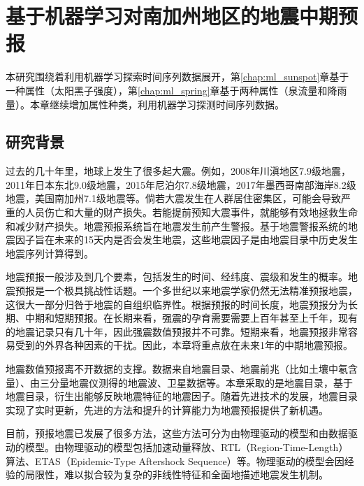 \chapter{基于机器学习对南加州地区的地震中期预报}\label{chap:ml_seismic}

本研究围绕着利用机器学习探索时间序列数据展开，第\ref{chap:ml_sunspot}章基于一种属性（太阳黑子强度），第\ref{chap:ml_spring}章基于两种属性（泉流量和降雨量）。本章继续增加属性种类，利用机器学习探测时间序列数据。

\section{研究背景}\label{sec:seism_introduction}

过去的几十年里，地球上发生了很多起大震。例如，2008年川滇地区7.9级地震，2011年日本东北9.0级地震，2015年尼泊尔7.8级地震，2017年墨西哥南部海岸8.2级地震，美国南加州7.1级地震等。倘若大震发生在人群居住密集区，可能会导致严重的人员伤亡和大量的财产损失。若能提前预知大震事件，就能够有效地拯救生命和减少财产损失。地震预报系统旨在地震发生前产生警报\citep{allen1976responsibilities}。基于地震警报系统的地震因子旨在未来的15天内是否会发生地震，这些地震因子是由地震目录中历史发生地震序列计算得到。

地震预报一般涉及到几个要素，包括发生的时间、经纬度、震级和发生的概率\citep{allen1976responsibilities}。地震预报是一个极具挑战性话题\citep{geller1997earthquakes}。一个多世纪以来地震学家仍然无法精准预报地震，这很大一部分归咎于地震的自组织临界性。根据预报的时间长度，地震预报分为长期、中期和短期预报\citep{Pulinets2018What}。在长期来看，强震的孕育需要需要上百年甚至上千年，现有的地震记录只有几十年，因此强震数值预报并不可靠。短期来看，地震预报非常容易受到的外界各种因素的干扰。因此，本章将重点放在未来1年的中期地震预报。

地震数值预报离不开数据的支撑。数据来自地震目录、地震前兆（比如土壤中氡含量）、由三分量地震仪测得的地震波、卫星数据等\citep{al2020application}。本章采取的是地震目录，基于地震目录，衍生出能够反映地震特征的地震因子。随着先进技术的发展，地震目录实现了实时更新，先进的方法和提升的计算能力为地震预报提供了新机遇。

目前，预报地震已发展了很多方法，这些方法可分为由物理驱动的模型和由数据驱动的模型。由物理驱动的模型包括加速动量释放\citep{Ben2002Accelerated}、RTL（Region-Time-Length）算法\citep{Sobolev2007On}、ETAS（Epidemic-Type Aftershock Sequence）\citep{Ogata1986Statistical}等。物理驱动的模型会因经验的局限性，难以拟合较为复杂的非线性特征和全面地描述地震发生机制。

